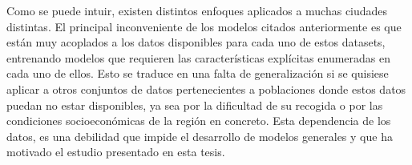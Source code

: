 \documentclass{uathesis-es}
\begin{document}
Como se puede intuir, existen distintos enfoques aplicados a muchas ciudades distintas. El principal inconveniente de los modelos citados anteriormente es que están muy acoplados a los datos disponibles para cada uno de estos datasets, entrenando modelos que requieren las características explícitas enumeradas en cada uno de ellos. Esto se traduce en una falta de generalización si se quisiese aplicar a otros conjuntos de datos pertenecientes a poblaciones donde estos datos puedan no estar disponibles, ya sea por la dificultad de su recogida o por las condiciones socioeconómicas de la región en concreto. Esta dependencia de los datos, es una debilidad que impide el desarrollo de modelos generales y que ha motivado el estudio presentado en esta tesis.













\end{document}
